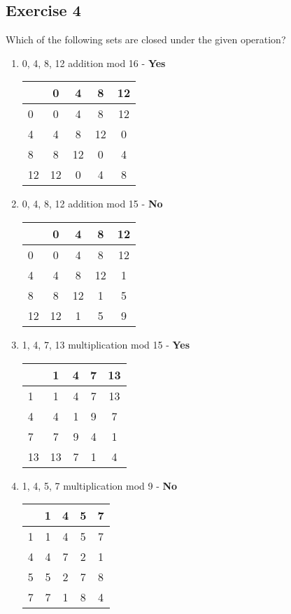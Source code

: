 \documentclass{article}
\newcommand\ssc[2][\DefaultOpt]{%
  \def\DefaultOpt{#2}%
  \subsection[#1]{#2}%
}
\newcommand{\balist}{\begin{enumerate}[label=\alph*.]}
\newcommand{\elist}{\end{enumerate}}
\begin{document}
\ssc{Exercise 4}{
Which of the following sets are closed under the given operation?
\balist
\item {0, 4, 8, 12} addition mod 16 - \textbf{Yes}

\begin{tabular}{l|cccc}
  & 0 & 4 & 8 & 12 \\
  \hline
  0 & 0 & 4 & 8 & 12 \\
  4 & 4 & 8 & 12 & 0 \\
  8 & 8 & 12 & 0 & 4 \\
  12 & 12 & 0 & 4 & 8
\end{tabular}

\item {0, 4, 8, 12} addition mod 15 - \textbf{No}

\begin{tabular}{l|cccc}
  & 0 & 4 & 8 & 12 \\
  \hline
  0 & 0 & 4 & 8 & 12 \\
  4 & 4 & 8 & 12 & 1 \\
  8 & 8 & 12 & 1 & 5 \\
  12 & 12 & 1 & 5 & 9
\end{tabular}

\item {1, 4, 7, 13} multiplication mod 15 - \textbf{Yes}

\begin{tabular}{l|cccc}
  & 1 & 4 & 7 & 13 \\
  \hline
  1 & 1 & 4 & 7 & 13 \\
  4 & 4 & 1 & 9 & 7 \\
  7 & 7 & 9 & 4 & 1 \\
  13 & 13 & 7 & 1 & 4
\end{tabular}

\item {1, 4, 5, 7} multiplication mod 9 - \textbf{No}

\begin{tabular}{l|cccc}
  & 1 & 4 & 5 & 7 \\
  \hline
  1 & 1 & 4 & 5 & 7 \\
  4 & 4 & 7 & 2 & 1 \\
  5 & 5 & 2 & 7 & 8 \\
  7 & 7 & 1 & 8 & 4
\end{tabular}

\elist

}
\end{document}
